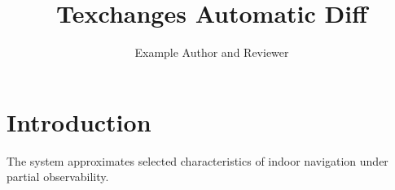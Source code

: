 \documentclass{article}
\title{Texchanges Automatic Diff}
\author{Example Author and Reviewer}
\date{}
\begin{document}
\maketitle

\section{Introduction}

The system approximates selected characteristics of indoor navigation under
partial observability.
\end{document}
